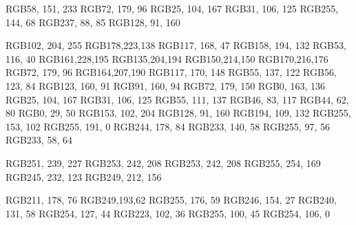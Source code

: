 
\definecolor{summer_sky}RGB{58, 151, 233}
\definecolor{chateau_green}RGB{72, 179, 96}
\definecolor{matisse}RGB{25, 104, 167}
\definecolor{allports}RGB{31, 106, 125}
\definecolor{sun_shade}RGB{255, 144, 68}
\definecolor{flamingo}RGB{237, 88, 85}
\definecolor{studio}RGB{128, 91, 160}



\definecolor{maya_blue}RGB{102, 204, 255}
\definecolor{feijoa}RGB{178,223,138}
\definecolor{sushi}RGB{117, 168, 47}
\definecolor{norway}RGB{158, 194, 132}
\definecolor{japanese_laurel}RGB{53, 116, 40}
\definecolor{see_green}RGB{161,228,195}
\definecolor{monte_carlo}RGB{135,204,194}
\definecolor{granny_smith_apple}RGB{150,214,150}
\definecolor{moss_green}RGB{170,216,176}
\definecolor{chateau_green}RGB{72, 179, 96}
\definecolor{opal}RGB{164,207,190}
\definecolor{acapulco}RGB{117, 170, 148}
\definecolor{viridian}RGB{55, 137, 122}
\definecolor{amazon}RGB{56, 123, 84}
\definecolor{asparagus}RGB{123, 160, 91}
\definecolor{fruit_salad}RGB{91, 160, 94}
\definecolor{puerto_rico}RGB{72, 179, 150}
\definecolor{mountain_meadow}RGB{0, 163, 136}
\definecolor{matisse}RGB{25, 104, 167}
\definecolor{allports}RGB{31, 106, 125}
\definecolor{astral}RGB{55, 111, 137}
\definecolor{spring_leaves}RGB{46, 83, 117}
\definecolor{biscay}RGB{44, 62, 80}
\definecolor{midnight}RGB{0, 29, 50}
\definecolor{amethyst}RGB{153, 102, 204}
\definecolor{studio}RGB{128, 91, 160}
\definecolor{tapestry}RGB{194, 109, 132}
\definecolor{atomic_tangerine}RGB{255, 153, 102}
\definecolor{amber}RGB{255, 191, 0}
\definecolor{casablanca}RGB{244, 178, 84}
\definecolor{california}RGB{233, 140, 58}
\definecolor{tomato}RGB{255, 97, 56} 
\definecolor{alizarin}RGB{233, 58, 64}



\definecolor{linen}RGB{251, 239, 227}
\definecolor{double_pearl_lusta}RGB{253, 242, 208}
\definecolor{oasis}RGB{253, 242, 208}
\definecolor{milan}RGB{255, 254, 169}
\definecolor{texas}RGB{245, 232, 123}
\definecolor{maize}RGB{249, 212, 156}

\definecolor{turmeric}RGB{211, 178, 76}
\definecolor{saffron}RGB{249,193,62}
\definecolor{my_sin}RGB{255, 176, 59}
\definecolor{tree_poppy}RGB{246, 154, 27}
\definecolor{jaffa}RGB{240, 131, 58}
\definecolor{crusta}RGB{254, 127, 44}
\definecolor{tahiti_gold}RGB{223, 102, 36}
\definecolor{outrageous_orange}RGB{255, 100, 45}
\definecolor{safety_orange}RGB{254, 106, 0}


